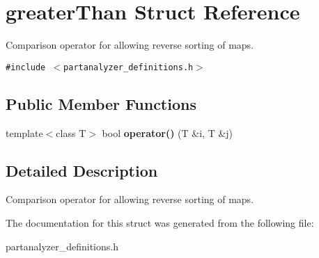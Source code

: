 \section{greater\-Than Struct Reference}
\label{structgreaterThan}
Comparison operator for allowing reverse sorting of maps.  


{\tt \#include $<$partanalyzer\_\-definitions.h$>$}

\subsection*{Public Member Functions}
\begin{CompactItemize}
\item 
template$<$class T$>$ bool {\bf operator()} (T \&i, T \&j)\label{structgreaterThan_a0}

\end{CompactItemize}


\subsection{Detailed Description}
Comparison operator for allowing reverse sorting of maps. 



The documentation for this struct was generated from the following file:\begin{CompactItemize}
\item 
partanalyzer\_\-definitions.h\end{CompactItemize}
